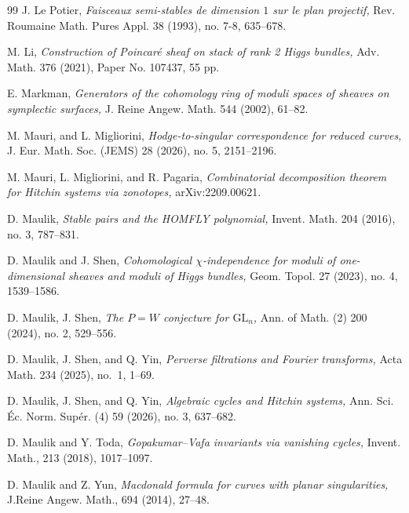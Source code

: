 \documentclass{pspum-l}
\theoremstyle{plain}
\theoremstyle{definition}
\theoremstyle{remark}
\begin{document}
\begin{thebibliography}{99}
 J. Le Potier, {\em Faisceaux semi-stables de dimension $1$ sur le plan projectif,} Rev. Roumaine Math. Pures Appl. 38 (1993), no. 7-8, 635--678.

 M. Li, {\em Construction of Poincaré sheaf on stack of rank 2 Higgs bundles,}  Adv. Math. 376 (2021), Paper No. 107437, 55 pp.


 E. Markman, {\em Generators of the cohomology ring of moduli spaces of sheaves on symplectic surfaces,} J. Reine Angew. Math. 544 (2002), 61--82.


 M. Mauri, and L. Migliorini, {\em Hodge-to-singular correspondence for reduced curves,} J. Eur. Math. Soc. (JEMS) 28 (2026), no. 5, 2151--2196.


 M. Mauri, L. Migliorini, and R. Pagaria, {\em Combinatorial decomposition theorem for Hitchin systems via zonotopes,}  arXiv:2209.00621.

 D. Maulik, {\em Stable pairs and the HOMFLY polynomial,} Invent. Math. 204 (2016), no. 3, 787--831.



 D. Maulik and J. Shen, {\em Cohomological $\chi$-independence for moduli of one-dimensional sheaves and moduli of Higgs bundles,} Geom. Topol. 27 (2023), no. 4, 1539--1586.




 D. Maulik, J. Shen, {\em The $P=W$ conjecture for $\mathrm{GL}_n$,} Ann. of Math. (2) 200 (2024), no. 2, 529--556.

 D. Maulik, J. Shen, and Q. Yin, {\em Perverse filtrations and Fourier transforms,} Acta Math. 234 (2025), no.~1, 1--69.


 D. Maulik, J. Shen, and Q. Yin, {\em Algebraic cycles and Hitchin systems,} Ann. Sci. \'Ec. Norm. Sup\'er. (4) 59 (2026), no. 3, 637--682.



 D. Maulik and Y. Toda, {\em Gopakumar--Vafa invariants via vanishing cycles,} Invent. Math., 213 (2018), 1017--1097.

 D. Maulik and Z. Yun, {\em
Macdonald formula for curves with planar singularities,} J.Reine Angew. Math., 694 (2014), 27--48.


\end{thebibliography}
\end{document}
